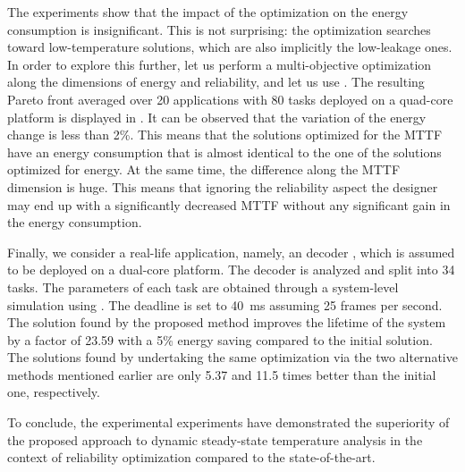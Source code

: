 The experiments show that the impact of the optimization on the energy
consumption is insignificant. This is not surprising: the optimization searches
toward low-temperature solutions, which are also implicitly the low-leakage
ones. In order to explore this further, let us perform a multi-objective
optimization along the dimensions of energy and reliability, and let us use
 \cite{deb2002}. The resulting Pareto front averaged over 20
applications with 80 tasks deployed on a quad-core platform is displayed in
. It can be observed that the variation of the
energy change is less than 2\%. This means that the solutions optimized for the
\ac{MTTF} have an energy consumption that is almost identical to the one of the
solutions optimized for energy. At the same time, the difference along the
\ac{MTTF} dimension is huge. This means that ignoring the reliability aspect the
designer may end up with a significantly decreased \ac{MTTF} without any
significant gain in the energy consumption.

Finally, we consider a real-life application, namely, an  decoder
\cite{ffmpeg}, which is assumed to be deployed on a dual-core platform. The
decoder is analyzed and split into 34 tasks. The parameters of each task are
obtained through a system-level simulation using  \cite{benini2005}.
The deadline is set to 40~ms assuming 25 frames per second. The solution found
by the proposed method improves the lifetime of the system by a factor of 23.59
with a 5\% energy saving compared to the initial solution. The solutions found
by undertaking the same optimization via the two alternative methods mentioned
earlier are only 5.37 and 11.5 times better than the initial one, respectively.

To conclude, the experimental experiments have demonstrated the superiority of
the proposed approach to dynamic steady-state temperature analysis in the
context of reliability optimization compared to the state-of-the-art.
